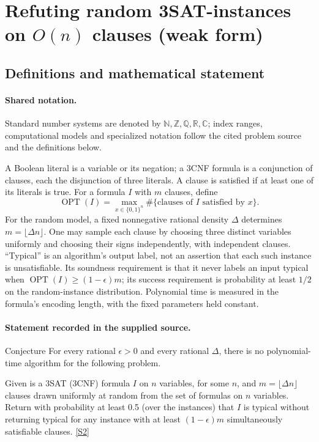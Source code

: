 \documentclass[11pt]{article}
\newcommand{\sref}[2]{\hyperlink{source:#1:#2}{[S#2]}}
\begin{document}
\section{Refuting random 3SAT-instances on $O(n)$ clauses (weak form)}\label{statement}

\subsection{Definitions and mathematical statement}

\paragraph{Shared notation.}Standard number systems are denoted by $\mathbb N,\mathbb Z,\mathbb Q,\mathbb R,\mathbb C$; index ranges, computational models and specialized notation follow the cited problem source and the definitions below.


A Boolean literal is a variable or its negation; a 3CNF formula is a conjunction of clauses, each the disjunction of three literals. A clause is satisfied if at least one of its literals is true. For a formula $I$ with $m$ clauses, define
\[
 \operatorname{OPT}(I)=\max_{x\in\{0,1\}^n}\#\{\text{clauses of }I\text{ satisfied by }x\}.
\]
For the random model, a fixed nonnegative rational density $\Delta$ determines $m=\lfloor\Delta n\rfloor$. One may sample each clause by choosing three distinct variables uniformly and choosing their signs independently, with independent clauses. ``Typical'' is an algorithm's output label, not an assertion that each such instance is unsatisfiable. Its soundness requirement is that it never labels an input typical when $\operatorname{OPT}(I)\ge(1-\epsilon)m$; its success requirement is probability at least $1/2$ on the random-instance distribution. Polynomial time is measured in the formula's encoding length, with the fixed parameters held constant.
\paragraph{Statement recorded in the supplied source.}
Conjecture For every rational $\epsilon > 0$ and every rational $\Delta$, there is no polynomial-time algorithm for the following problem.

Given is a 3SAT (3CNF) formula $I$ on $n$ variables, for some $n$, and $m = \lfloor\Delta n\rfloor$ clauses drawn uniformly at random from the set of formulas on $n$ variables. Return with probability at least 0.5 (over the instances) that $I$ is typical without returning typical for any instance with at least $(1 - \epsilon)m$ simultaneously satisfiable clauses. \sref{statement}{2}
\end{document}
